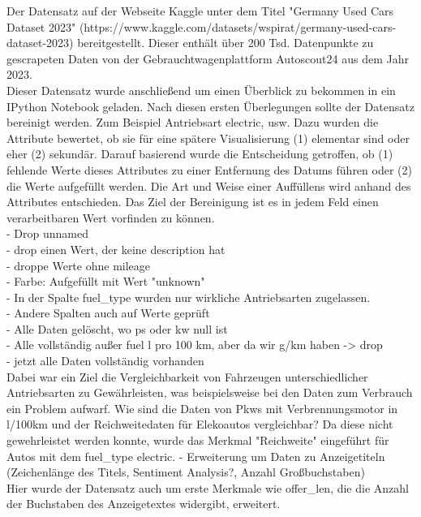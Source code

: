 \documentclass[usegeometry=true]{scrartcl}
\begin{document}
Der Datensatz auf der Webseite Kaggle unter dem Titel "Germany Used Cars Dataset 2023" (https://www.kaggle.com/datasets/wspirat/germany-used-cars-dataset-2023) bereitgestellt. Dieser enthält über 200 Tsd. Datenpunkte zu gescrapeten Daten von der Gebrauchtwagenplattform Autoscout24 aus dem Jahr 2023. \\
Dieser Datensatz wurde anschließend um einen Überblick zu bekommen in ein IPython Notebook geladen. 
Nach diesen ersten Überlegungen sollte der Datensatz bereinigt werden. Zum Beispiel Antriebsart electric, usw.  Dazu wurden die Attribute bewertet, ob sie für eine spätere Visualisierung (1) elementar sind oder eher (2) sekundär. Darauf basierend wurde die Entscheidung getroffen, ob (1) fehlende Werte dieses Attributes zu einer Entfernung des Datums führen oder (2) die Werte aufgefüllt werden. Die Art und Weise einer Auffüllens wird anhand des Attributes entschieden. Das Ziel der Bereinigung ist es in jedem Feld einen verarbeitbaren Wert vorfinden zu können.\\
- Drop unnamed \\
- drop einen Wert, der keine description hat \\
- droppe Werte ohne mileage \\
- Farbe: Aufgefüllt mit Wert "unknown" \\
- In der Spalte fuel_type wurden nur wirkliche Antriebsarten zugelassen. \\
- Andere Spalten auch auf Werte geprüft \\
- Alle Daten gelöscht, wo ps oder kw null ist \\
- Alle vollständig außer fuel l pro 100 km, aber da wir g/km haben -> drop \\
- jetzt alle Daten vollständig vorhanden \\
Dabei war ein Ziel die Vergleichbarkeit von Fahrzeugen unterschiedlicher Antriebsarten zu Gewährleisten, was beispielsweise bei den Daten zum Verbrauch ein Problem aufwarf. Wie sind die Daten von Pkws mit Verbrennungsmotor in l/100km und der Reichweitedaten für Elekoautos vergleichbar? Da diese nicht gewehrleistet werden konnte, wurde das Merkmal "Reichweite" eingeführt für Autos mit dem fuel_type electric.
- Erweiterung um Daten zu Anzeigetiteln (Zeichenlänge des Titels, Sentiment Analysis?, Anzahl Großbuchstaben) \\

Hier wurde der Datensatz auch um erste Merkmale wie offer_len, die die Anzahl der Buchstaben des Anzeigetextes widergibt, erweitert. \\
\end{document}
